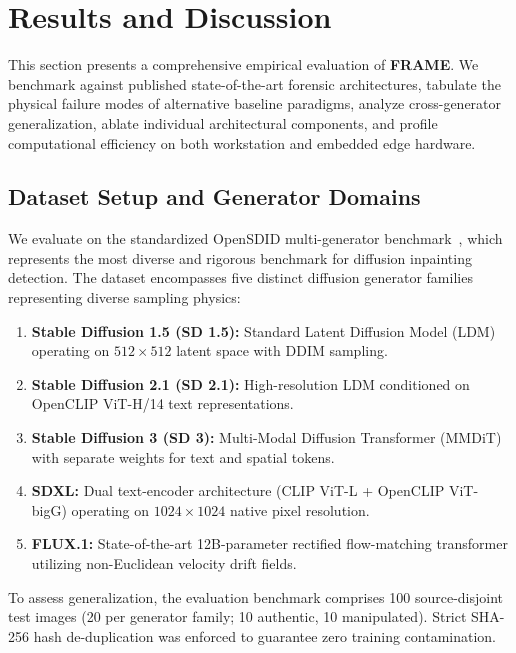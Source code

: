 \section{Results and Discussion}
\label{sec:results}

This section presents a comprehensive empirical evaluation of \textbf{FRAME}. We benchmark against published state-of-the-art forensic architectures, tabulate the physical failure modes of alternative baseline paradigms, analyze cross-generator generalization, ablate individual architectural components, and profile computational efficiency on both workstation and embedded edge hardware.

\subsection{Dataset Setup and Generator Domains}
\label{sec:dataset}
We evaluate on the standardized OpenSDID multi-generator benchmark~\cite{opensdi}, which represents the most diverse and rigorous benchmark for diffusion inpainting detection. The dataset encompasses five distinct diffusion generator families representing diverse sampling physics:
\begin{enumerate}
    \item \textbf{Stable Diffusion 1.5 (SD 1.5):} Standard Latent Diffusion Model (LDM) operating on $512 \times 512$ latent space with DDIM sampling.
    \item \textbf{Stable Diffusion 2.1 (SD 2.1):} High-resolution LDM conditioned on OpenCLIP ViT-H/14 text representations.
    \item \textbf{Stable Diffusion 3 (SD 3):} Multi-Modal Diffusion Transformer (MMDiT) with separate weights for text and spatial tokens.
    \item \textbf{SDXL:} Dual text-encoder architecture (CLIP ViT-L + OpenCLIP ViT-bigG) operating on $1024 \times 1024$ native pixel resolution.
    \item \textbf{FLUX.1:} State-of-the-art 12B-parameter rectified flow-matching transformer utilizing non-Euclidean velocity drift fields.
\end{enumerate}
To assess generalization, the evaluation benchmark comprises 100 source-disjoint test images (20 per generator family; 10 authentic, 10 manipulated). Strict SHA-256 hash de-duplication was enforced to guarantee zero training contamination.

